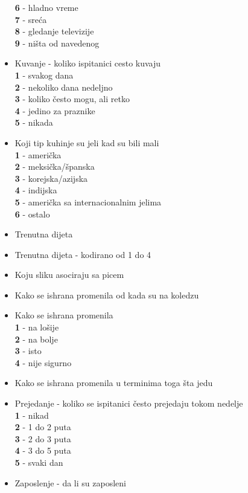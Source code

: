 \documentclass[12pt,a4paper]{article}
\begin{document}
\begin{itemize}
   \textbf{6} - hladno vreme \\
   \textbf{7} - sre\'  ca\\ 
   \textbf{8} - gledanje televizije\\
   \textbf{9} - ni\v sta od navedenog
   \item Kuvanje - koliko ispitanici cesto kuvaju\\
    \textbf{1} - svakog dana\\
    \textbf{2} - nekoliko dana nedeljno\\
    \textbf{3} - koliko \v cesto mogu, ali retko\\
    \textbf{4} - jedino za praznike\\
    \textbf{5} - nikada
  \item Koji tip kuhinje su jeli kad su bili mali\\
    \textbf{1} - ameri\v cka\\
    \textbf{2} - meksi\v cka/\v spanska\\
    \textbf{3} - korejska/azijska\\
    \textbf{4} - indijska\\
    \textbf{5} - ameri\v cka sa internacionalnim jelima\\
    \textbf{6} - ostalo
  \item Trenutna dijeta
  \item Trenutna dijeta - kodirano od 1 do 4
  \item Koju sliku asociraju sa picem
  \item Kako se ishrana promenila od kada su na koledzu
  \item Kako se ishrana promenila\\
    \textbf{1} - na lo\v sije\\
    \textbf{2} - na bolje\\
    \textbf{3} - isto\\
    \textbf{4} - nije sigurno
  \item Kako se ishrana promenila u terminima toga \v sta jedu
  \item Prejedanje - koliko se ispitanici \v cesto prejedaju tokom nedelje\\
    \textbf{1} - nikad\\
    \textbf{2} - 1 do 2 puta\\
    \textbf{3} - 2 do 3 puta\\
    \textbf{4} - 3 do 5 puta\\
    \textbf{5} - svaki dan
  \item Zaposlenje - da li su zaposleni

\end{itemize}
\end{document}
